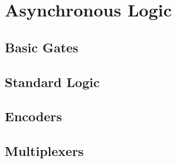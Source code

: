 
\chapter{Asynchronous Logic}
\section{Basic Gates}
\section{Standard Logic}
\section{Encoders}
\section{Multiplexers}




